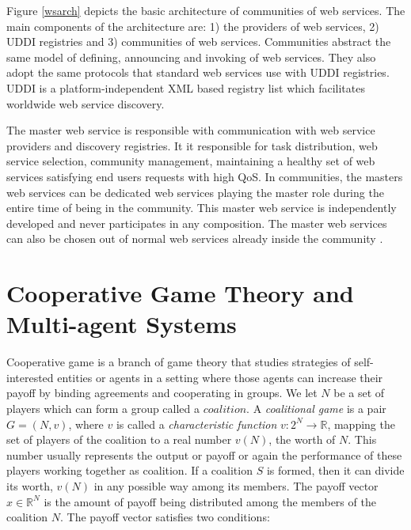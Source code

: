         Figure \ref{wsarch} depicts the basic architecture of communities of web services. The main components of the architecture are: 1) the providers of web services,
        2) UDDI registries and 3) communities of web services. Communities abstract the same model of defining, announcing and invoking of web services. They also adopt the same protocols that standard web services use with UDDI registries. UDDI is a platform-independent XML based registry list which facilitates worldwide web service discovery.

        The master web service is responsible with communication with web service providers and discovery registries. It it responsible for task distribution, web service selection,
        community management, maintaining a healthy set of web services satisfying end users requests with high QoS. In communities, the masters web services can be
        dedicated web services playing the master role during the entire time of being in the community. This master web service is independently developed and never
        participates in any composition. The master web services can also be chosen out of normal web services already inside the community \cite{DBLP:journals/ijebr/MaamarSTBB09}.


    \section{Cooperative Game Theory and Multi-agent Systems}\label{sec:CGTMS}



        Cooperative game is a branch of game theory that studies
        strategies of self-interested entities or agents in a setting
        where those agents can increase their payoff by binding agreements
        and cooperating in groups. We let $N$ be a set of players which can form a group called a $coalition$. A
        \emph{coalitional game} is a pair $G = (N, v)$, where $v$ is called
        a \emph{characteristic function} $v: 2^N \to \mathbb{R}$, mapping the set of players of the
        coalition to a real number $v(N)$, the worth of $N$. This number
        usually represents the output or payoff or again the performance
        of these players working together as coalition.  If a coalition
        $S$ is formed, then it can divide its worth, $v(N)$ in any
        possible way among its members. The payoff vector $x \in
        \mathbb{R}^N$ is the amount of payoff being distributed among the
        members of the coalition $N$. The payoff vector satisfies two
        conditions:

